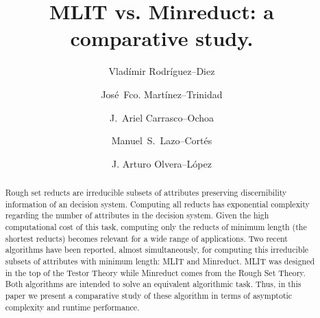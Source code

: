 \documentclass[citenumber]{llncs}
\begin{document}
\mainmatter              %
%
\title{MLIT vs. Minreduct: a comparative study.}
			 
\author{Vlad\'{i}mir Rodr\'{i}guez--Diez \and Jos\'{e}~Fco. Mart\'{i}nez--Trinidad
		 \and J.~Ariel Carrasco--Ochoa \and Manuel~S.~Lazo--Cortés \and J. Arturo Olvera--López}
%
%


\maketitle              %

\begin{abstract}
	Rough set reducts are irreducible subsets of attributes preserving discernibility information of an decision system. Computing all reducts has exponential complexity regarding the number of attributes in the decision system. Given the high computational cost of this task, computing only the reducts of minimum length (the shortest reducts) becomes relevant for a wide range of applications. Two recent algorithms have been reported, almost simultaneously, for computing this irreducible subsets of attributes with minimum length: MLIT and Minreduct. MLIT was designed in the top of the Testor Theory while Minreduct comes from the Rough Set Theory. Both algorithms are intended to solve an equivalent algorithmic task. Thus, in this paper we present a comparative study of these algorithm in terms of asymptotic complexity and runtime performance. 
	
\end{abstract}
%
\end{document}

